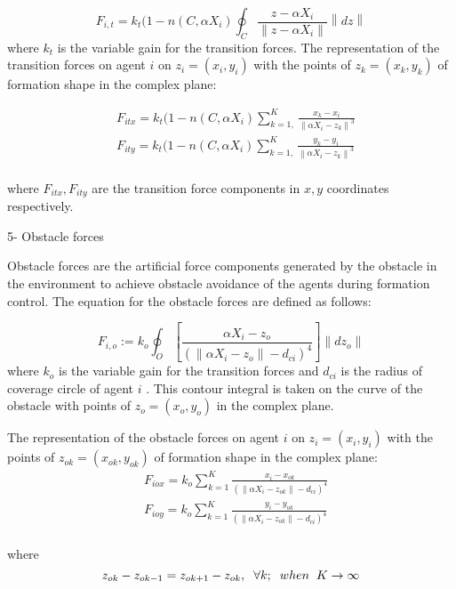 \documentclass[twoside]{article}
\newcommand{\norm}[1]{\left\lVert#1\right\rVert}
\begin{document}
\begin{multicols}{2}
				\begin{equation}
 F_{i,t} = k_t (1-n(C,\alpha X_i) \oint_C \frac{z-\alpha X_i}{\norm{z-\alpha X_i}}\norm{dz}
				\end{equation}
				where $k_t$ is the variable gain for the transition forces. The representation of the transition forces on agent $i$ on $z_i = (x_i, y_i)$ with the points of  $z_k = (x_k,y_k)$ of formation shape in the complex plane:
			
\begin{align*}
&F_{itx} = k_t  (1-n(C,\alpha X_i) \sum_{k=1,}^{K}\frac{x_k- x_i}{\norm{\alpha X_i - z_k}^3}\\
&F_{ity} = k_t  (1-n(C,\alpha X_i) \sum_{k=1,}^{K}\frac{y_k- y_i}{\norm{\alpha X_i - z_k}^3}\\
\end{align*}
			
			where  $F_{itx} , F_{ity} $ are the transition force components in $x,y$ coordinates respectively.
			
			5- Obstacle forces
			
			Obstacle forces are the artificial force components generated by the obstacle in the environment to achieve obstacle avoidance of the agents during formation control. 	
			The equation for the obstacle forces are defined as follows:	
			
			\begin{equation}
F_{i,o} := k_o  \oint_O \left[\frac{\alpha X_i - z_o}{(\norm{\alpha X_i - z_o} - d_{ci})^4}\right] \norm{dz_o}
			\end{equation}
			where $k_o$ is the variable gain for the transition forces and $d_{ci}$ is the radius of coverage circle of agent $i$ . This contour integral is taken on the curve of the obstacle with  points of $z_o = (x_o,y_o)$ in the complex plane.
			
			The representation of the obstacle forces on agent $i$ on $z_i = (x_i, y_i)$ with the points of  $z_{ok} = (x_{ok},y_{ok})$ of formation shape in the complex plane:
			\begin{align*}
			& F_{iox} = k_o   \sum_{k=1}^{K} \frac{x_i -x_{ok}}{(\norm{\alpha X_i - z_{ok}} -d_{ci})^4}\\
			& F_{ioy} = k_o   \sum_{k=1}^{K} \frac{y_i - y_{ok}}{(\norm{\alpha X_i - z_{ok}} -d_{ci})^4}\\
			\end{align*}
			
			where
			\begin{equation}
		z_{ok}- z_{ok -1} = z_{ok+1} - z_{ok}, \hspace{0.2cm}  \forall k ;  \hspace{0.2cm} when  \hspace{0.2cm} K \to\infty
			\end{equation}
			

\end{multicols}
\end{document}
